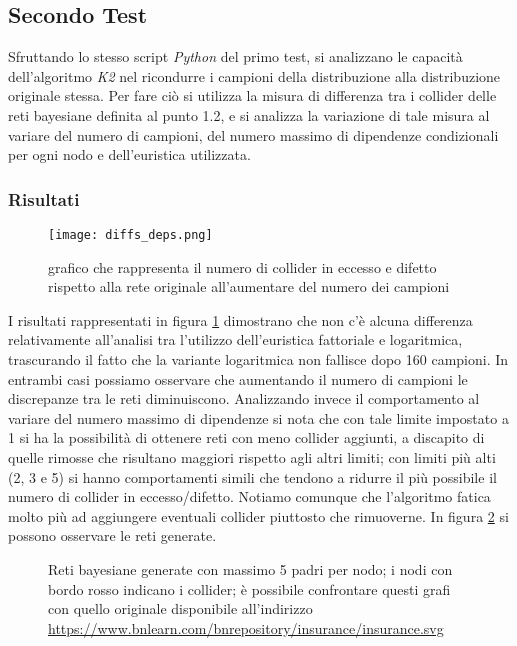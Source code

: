 \subsection{Secondo Test}

Sfruttando lo stesso script \textit{Python} del primo test, si analizzano le capacità
dell'algoritmo \textit{K2} nel ricondurre i campioni della distribuzione alla distribuzione
originale stessa. Per fare ciò si utilizza la misura di differenza tra i collider delle reti
bayesiane definita al punto 1.2, e si analizza la variazione di tale misura al variare del numero
di campioni, del numero massimo di dipendenze condizionali per ogni nodo e dell'euristica
utilizzata.

\subsubsection{Risultati}

\begin{figure}[h]
    \centering
    \texttt{[image: diffs\_deps.png]}
    \caption{grafico che rappresenta il numero di collider in eccesso e difetto rispetto alla rete
        originale all'aumentare del numero dei campioni}
    \label{fig:test2}
\end{figure}

I risultati rappresentati in figura \ref{fig:test2} dimostrano che non c'è alcuna differenza
relativamente all'analisi tra l'utilizzo dell'euristica fattoriale e logaritmica, trascurando il
fatto che la variante logaritmica non fallisce dopo 160 campioni. In entrambi casi possiamo
osservare che aumentando il numero di campioni le discrepanze tra le reti diminuiscono. Analizzando
invece il comportamento al variare del numero massimo di dipendenze si nota che con tale limite
impostato a 1 si ha la possibilità di ottenere reti con meno collider aggiunti, a discapito di
quelle rimosse che risultano maggiori rispetto agli altri limiti; con limiti più alti (2, 3 e 5) si
hanno comportamenti simili che tendono a ridurre il più possibile il numero di collider in
eccesso/difetto. Notiamo comunque che l'algoritmo fatica molto più ad aggiungere eventuali collider
piuttosto che rimuoverne. In figura \ref{fig:test2:2} si possono osservare le reti generate.

\begin{figure}
    \centering
    \qquad
    \caption{Reti bayesiane generate con massimo 5 padri per nodo; i nodi con bordo rosso indicano i collider; è possibile confrontare questi
        grafi con quello originale disponibile all'indirizzo \url{https://www.bnlearn.com/bnrepository/insurance/insurance.svg}}
    \label{fig:test2:2}%
\end{figure}

